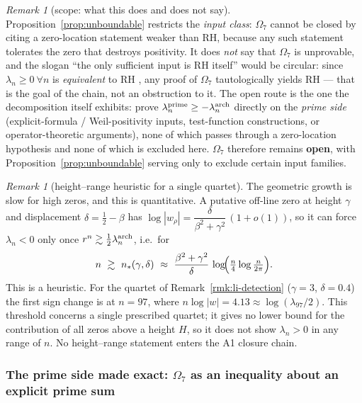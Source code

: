 \documentclass[11pt]{amsart}
\theoremstyle{definition}
\theoremstyle{remark}
\newtheorem{remark}[theorem]{Remark}
\theoremstyle{definition}
\begin{document}
\begin{remark}[scope: what this does and does not say]\label{rmk:unboundable-scope}
Proposition~\ref{prop:unboundable} restricts the \emph{input class}: $\Omega_7$ cannot be closed by
citing a zero-location statement weaker than RH, because any such statement tolerates the zero that
destroys positivity.  It does \emph{not} say that $\Omega_7$ is unprovable, and the slogan ``the only
sufficient input is RH itself'' would be circular: since $\lambda_n\ge0\ \forall n$ is
\emph{equivalent} to RH \cite{Li}, any proof of $\Omega_7$ tautologically yields RH --- that is the
goal of the chain, not an obstruction to it.  The open route is the one the decomposition itself
exhibits: prove $\lambda_n^{\rm prime}\ge-\lambda_n^{\rm arch}$ directly on the \emph{prime side}
(explicit-formula / Weil-positivity inputs, test-function constructions, or operator-theoretic
arguments), none of which passes through a zero-location hypothesis and
none of which is excluded here.  $\Omega_7$ therefore remains \textbf{open}, with
Proposition~\ref{prop:unboundable} serving only to exclude certain input families.
\end{remark}

\begin{remark}[height--range heuristic for a single quartet]\label{rmk:height-range}
The geometric growth is slow for high zeros, and this is quantitative.  A putative off-line zero at
height $\gamma$ and displacement $\delta=\tfrac12-\beta$ has
$\log|w_\rho|=\dfrac{\delta}{\beta^2+\gamma^2}\,(1+o(1))$, so it can force $\lambda_n<0$ only once
$r^n\gtrsim\tfrac12\lambda_n^{\rm arch}$, i.e.\ for
\[
   n\ \gtrsim\ n_*(\gamma,\delta)\ \approx\ \frac{\beta^2+\gamma^2}{\delta}\,
   \log\!\Bigl(\tfrac n4\log\tfrac n{2\pi}\Bigr).
\]
This is a heuristic.  For the quartet of Remark~\ref{rmk:li-detection} ($\gamma=3$, $\delta=0.4$)
the first sign change is at $n=97$, where $n\log|w|=4.13\approx\log(\lambda_{97}/2)$.  This threshold concerns a single prescribed quartet; it gives no lower bound for the
contribution of all zeros above a height $H$, so it does not show $\lambda_n>0$ in any range of $n$.
No height--range statement enters the A1 closure chain.
\end{remark}

\subsubsection*{The prime side made exact: $\Omega_7$ as an inequality about an explicit prime sum}
\end{document}
